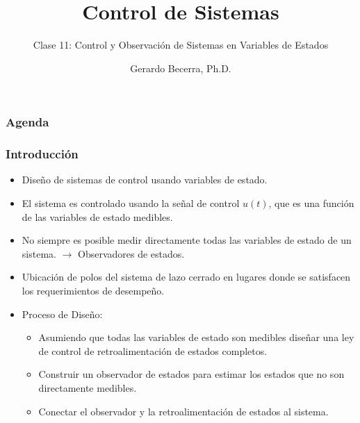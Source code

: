 \documentclass[aspectratio=169]{beamer}
\title{Control de Sistemas}
\subtitle{\small Clase 11: Control y Observación de Sistemas en Variables de Estados}
\author{Gerardo Becerra, Ph.D.}
\institute{Pontificia Universidad Javeriana\\ Departamento de Electrónica}
\date{}
\theoremstyle{definition}
\theoremstyle{plain}
\theoremstyle{remark}
\begin{document}
\frame{\titlepage}	

\begin{frame}[<+->]\frametitle{Agenda}
	\vspace{5mm}
	\tableofcontents
\end{frame}

\begin{frame}[<+->]\frametitle{Introducción}
\centering
\begin{itemize}
	\item Diseño de sistemas de control usando variables de estado.
	\item El sistema es controlado usando la señal de control $u(t)$, que es una función de las variables de estado medibles.
	\item No siempre es posible medir directamente todas las variables de estado de un sistema. $\rightarrow$  Observadores de estados.
	\item Ubicación de polos del sistema de lazo cerrado en lugares donde se satisfacen los requerimientos de desempeño.
	\item Proceso de Diseño:
	\begin{itemize}
		\item Asumiendo que todas las variables de estado son medibles diseñar una ley de control de retroalimentación de estados completos.
		\item Construir un observador de estados para estimar los estados que no son directamente medibles.
		\item Conectar el observador y la retroalimentación de estados al sistema.
	\end{itemize}
\end{itemize}
\end{frame}
\end{document}
